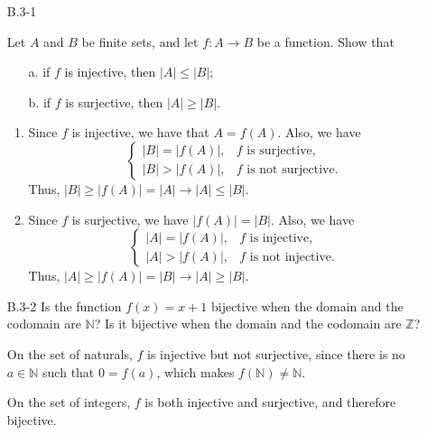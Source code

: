 \documentclass{report}
\makeatletter
\renewenvironment{framed}{%
 \def\FrameCommand##1{\hskip\@totalleftmargin
 \fboxsep=\FrameSep\fbox{##1}}%
 \MakeFramed {\advance\hsize-\width
   \@totalleftmargin\z@ \linewidth\hsize
   \@setminipage}}%
 {\par\unskip\endMakeFramed}
\makeatother
\begin{document}
\begin{enumerate}

\item[B.3{-}1]{Let $A$ and $B$ be finite sets, and let $f : A \rightarrow B$ be
a function. Show that
\begin{enumerate}
\item[a.] if $f$ is injective, then $|A| \le |B|$;
\item[b.] if $f$ is surjective, then $|A| \ge |B|$.
\end{enumerate}
}

\begin{framed}
\begin{enumerate}
  \item Since $f$ is injective, we have that $A = f(A)$. Also, we have
    \begin{equation*}
    \begin{cases}
      |B| = |f(A)|, & f \text{ is surjective},\\
      |B| > |f(A)|, & f \text{ is not surjective}.
    \end{cases}
    \end{equation*}
    Thus, $|B| \ge |f(A)| = |A| \rightarrow |A| \le |B|$.
  \item Since $f$ is surjective, we have $|f(A)| = |B|$. Also, we have
    \begin{equation*}
    \begin{cases}
      |A| = |f(A)|, & f \text{ is injective},\\
      |A| > |f(A)|, & f \text{ is not injective}.
    \end{cases}
    \end{equation*}
    Thus, $|A| \ge |f(A)| = |B| \rightarrow |A| \ge |B|$.
\end{enumerate}
\end{framed}

\item[B.3{-}2]{Is the function $f(x) = x + 1$ bijective when the domain and the
codomain are $\mathbb{N}$? Is it bijective when the domain and the codomain are
$\mathbb{Z}$?}

\begin{framed}
On the set of naturals, $f$ is injective but not surjective, since there is no
$a \in \mathbb{N}$ such that $0 = f(a)$, which makes
$f(\mathbb{N}) \neq \mathbb{N}$.

On the set of integers, $f$ is both injective and surjective, and therefore
bijective.
\end{framed}


\end{enumerate}
\end{document}
